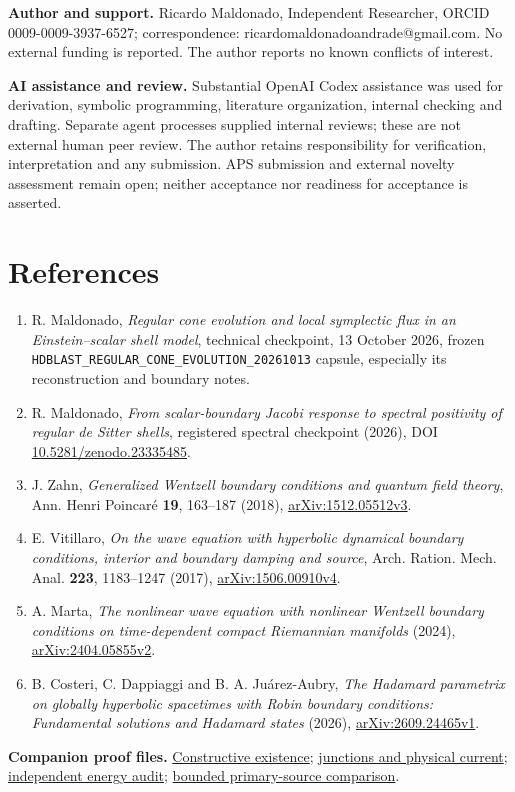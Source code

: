 \documentclass[
  10pt,
]{article}
\providecommand{\tightlist}{%
  \setlength{\itemsep}{0pt}\setlength{\parskip}{0pt}}
\begin{document}
\textbf{Author and support.} Ricardo Maldonado, Independent Researcher,
ORCID 0009-0009-3937-6527; correspondence:
ricardomaldonadoandrade@gmail.com. No external funding is reported. The
author reports no known conflicts of interest.

\textbf{AI assistance and review.} Substantial OpenAI Codex assistance
was used for derivation, symbolic programming, literature organization,
internal checking and drafting. Separate agent processes supplied
internal reviews; these are not external human peer review. The author
retains responsibility for verification, interpretation and any
submission. APS submission and external novelty assessment remain open;
neither acceptance nor readiness for acceptance is asserted.

\section{References}\label{references}

\begin{enumerate}
\def\labelenumi{\arabic{enumi}.}
\tightlist
\item
  R. Maldonado, \emph{Regular cone evolution and local symplectic flux
  in an Einstein--scalar shell model}, technical checkpoint, 13 October
  2026, frozen \texttt{HDBLAST\_REGULAR\_CONE\_EVOLUTION\_20261013}
  capsule, especially its reconstruction and boundary notes.
\item
  R. Maldonado, \emph{From scalar-boundary Jacobi response to spectral
  positivity of regular de Sitter shells}, registered spectral
  checkpoint (2026), DOI
  \href{https://doi.org/10.5281/zenodo.23335485}{10.5281/zenodo.23335485}.
\item
  J. Zahn, \emph{Generalized Wentzell boundary conditions and quantum
  field theory}, Ann. Henri Poincaré \textbf{19}, 163--187 (2018),
  \href{https://arxiv.org/abs/1512.05512v3}{arXiv:1512.05512v3}.
\item
  E. Vitillaro, \emph{On the wave equation with hyperbolic dynamical
  boundary conditions, interior and boundary damping and source}, Arch.
  Ration. Mech. Anal. \textbf{223}, 1183--1247 (2017),
  \href{https://arxiv.org/abs/1506.00910v4}{arXiv:1506.00910v4}.
\item
  A. Marta, \emph{The nonlinear wave equation with nonlinear Wentzell
  boundary conditions on time-dependent compact Riemannian manifolds}
  (2024), \href{https://arxiv.org/abs/2404.05855v2}{arXiv:2404.05855v2}.
\item
  B. Costeri, C. Dappiaggi and B. A. Juárez-Aubry, \emph{The Hadamard
  parametrix on globally hyperbolic spacetimes with Robin boundary
  conditions: Fundamental solutions and Hadamard states} (2026),
  \href{https://arxiv.org/abs/2609.24465v1}{arXiv:2609.24465v1}.
\end{enumerate}

\textbf{Companion proof files.}
\href{../existence/FINITE_SLAB_SHELL_CONTACT_EXISTENCE.md}{Constructive
existence};
\href{../junctions/FULL_PACKET_JUNCTION_SUFFICIENCY_AND_CURRENT.md}{junctions
and physical current};
\href{../existence/independent/ENERGY_EXISTENCE_AUDIT.md}{independent
energy audit};
\href{../literature/SHELL_CONTACT_PRIOR_ART_AND_ASSUMPTIONS.md}{bounded
primary-source comparison}.
\end{document}
